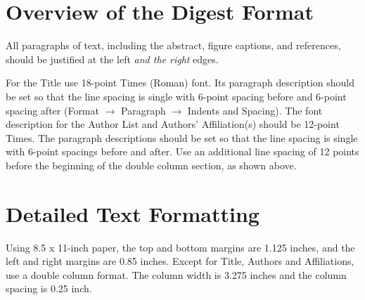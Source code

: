 \documentclass[conference]{IEEEtran}
\begin{document}
\section{Overview of the Digest Format}
All paragraphs of text, including the abstract, figure captions, and references, should be justified at the left {\itshape and the right} edges.

For the Title use 18-point Times (Roman) font. Its paragraph description should be set so that the line spacing is single with 6-point spacing before and 6-point spacing after (Format $\rightarrow$ Paragraph $\rightarrow$ Indents and Spacing). The font description for the Author List and Authors' Affiliation(s) should be 12-point Times. The paragraph descriptions should be set so that the line spacing is single with 6-point spacings before and after. Use an additional line spacing of 12 points before the beginning of the double column section, as shown above.
\section{Detailed Text Formatting}
Using 8.5 x 11-inch paper, the top and bottom margins are 1.125 inches, and the left and right margins are
0.85 inches. Except for Title, Authors and Affiliations, use a double column format. The column width is 3.275 inches and the column spacing is 0.25 inch.
\end{document}
